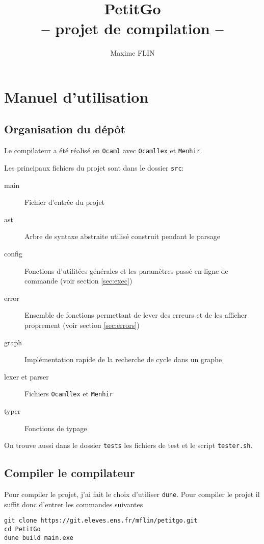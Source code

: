 \documentclass{article}
\title{
  PetitGo \\
  \large -- projet de compilation --}
\author{Maxime FLIN}
\begin{document}
\maketitle

\section{Manuel d'utilisation}
\subsection{Organisation du dépôt}
Le compilateur a été réalisé en \texttt{Ocaml} avec \texttt{Ocamllex} et \texttt{Menhir}.

Les principaux fichiers du projet sont dans le dossier \texttt{src}:

\begin{description}
\item[main] Fichier d'entrée du projet
\item[ast] Arbre de syntaxe abstraite utilisé construit pendant le parsage
\item[config] Fonctions d'utilitées générales et les paramètres passé en ligne de commande (voir section \ref{sec:exec})
\item[error] Ensemble de fonctions permettant de lever des erreurs et de les afficher proprement (voir section \ref{sec:errors})
\item[graph] Implémentation rapide de la recherche de cycle dans un graphe
\item[lexer et parser] Fichiers \texttt{Ocamllex} et \texttt{Menhir}
\item[typer] Fonctions de typage
\end{description}

On trouve aussi dans le dossier \texttt{tests} les fichiers de test et le script \texttt{tester.sh}.

\subsection{Compiler le compilateur}

Pour compiler le projet, j'ai fait le choix d'utiliser \texttt{dune}. Pour compiler le projet il suffit donc d'entrer les commandes suivantes

\begin{verbatim}
git clone https://git.eleves.ens.fr/mflin/petitgo.git
cd PetitGo
dune build main.exe
\end{verbatim}
\end{document}
